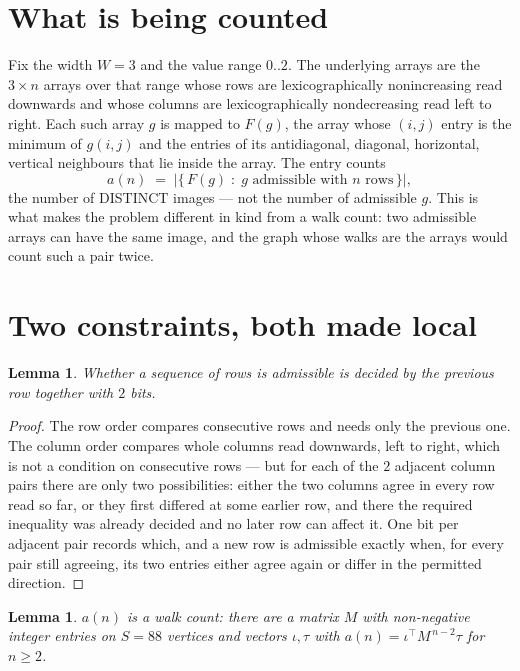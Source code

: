 \documentclass[11pt,a4paper]{article}
\theoremstyle{plain}
\newtheorem{lemma}[theorem]{Lemma}
\theoremstyle{definition}
\begin{document}
\section{What is being counted}

Fix the width $W=3$ and the value range $0..2$. The underlying arrays are the
$3\times n$ arrays over that range whose rows are lexicographically nonincreasing read downwards
and whose columns are lexicographically nondecreasing read left to right. Each such array $g$
is mapped to $F(g)$, the array whose $(i,j)$ entry is the minimum of $g(i,j)$ and the entries
of its antidiagonal, diagonal, horizontal, vertical neighbours that lie inside the array. The entry counts
\[
a(n)\;=\;\bigl|\{\,F(g)\;:\;g\text{ admissible with }n\text{ rows}\,\}\bigr|,
\]
the number of DISTINCT images --- not the number of admissible $g$. This is what makes the
problem different in kind from a walk count: two admissible arrays can have the same image, and
the graph whose walks are the arrays would count such a pair twice.

\section{Two constraints, both made local}

\begin{lemma}\label{lem:local}
Whether a sequence of rows is admissible is decided by the previous row together with
$2$ bits.
\end{lemma}

\begin{proof}
The row order compares consecutive rows and needs only the previous one. The column order
compares whole columns read downwards, left to right, which is not a condition on consecutive
rows --- but for each of the $2$ adjacent column pairs there are only two possibilities:
either the two columns agree in every row read so far, or they first differed at some earlier
row, and there the required inequality was already decided and no later row can affect it. One
bit per adjacent pair records which, and a new row is admissible exactly when, for every pair
still agreeing, its two entries either agree again or differ in the permitted direction.
\end{proof}

\begin{lemma}\label{lem:det}
$a(n)$ is a walk count: there are a matrix $M$ with non-negative integer entries on $S=88$
vertices and vectors $\iota,\tau$ with $a(n)=\iota^{\!\top}M^{\,n-2}\tau$ for $n\ge2$.
\end{lemma}
\end{document}
